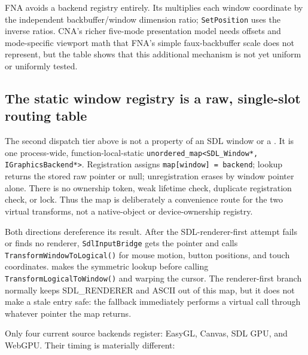 FNA avoids a backend registry entirely. Its  multiplies each
window coordinate by the independent backbuffer/window dimension ratio; \texttt{SetPosition}
uses the inverse ratios. CNA's richer five-mode presentation model needs offsets and
mode-specific viewport math that FNA's simple faux-backbuffer scale does not represent, but
the table shows that this additional mechanism is not yet uniform or uniformly tested.

\subsection{The static window registry is a raw, single-slot routing table}
\label{sec:backend-window-registry-lifetime}

The second dispatch tier above is not a property of an SDL window or a
.  It is one process-wide, function-local-static
\texttt{unordered\_map<SDL\_Window*, IGraphicsBackend*>}.  Registration assigns
\texttt{map[window] = backend}; lookup returns the stored raw pointer or null; unregistration
erases by window pointer alone.  There is no ownership token, weak lifetime check, duplicate
registration check, or lock.  Thus the map is deliberately a convenience route for the two
virtual transforms, not a native-object or device-ownership registry.

Both directions dereference its result.  After the SDL-renderer-first attempt fails or finds no
renderer, \texttt{SdlInputBridge} gets the pointer and calls
\texttt{TransformWindowToLogical()} for mouse motion, button positions, and touch coordinates.
 makes the symmetric lookup before calling
\texttt{TransformLogicalToWindow()} and warping the cursor.  The renderer-first branch normally
keeps SDL\_RENDERER and ASCII out of this map, but it does not make a stale entry safe: the
fallback immediately performs a virtual call through whatever pointer the map returns.

Only four current source backends register: EasyGL, Canvas, SDL GPU, and WebGPU.  Their timing
is materially different:

